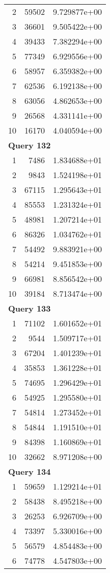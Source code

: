 \begin{longtable}[{p}]{@{}rrp{}@{}}
2 & 59502 & 9.729877e+00 \\
3 & 36601 & 9.505422e+00 \\
4 & 39433 & 7.382294e+00 \\
5 & 77349 & 6.929556e+00 \\
6 & 58957 & 6.359382e+00 \\
7 & 62536 & 6.192138e+00 \\
8 & 63056 & 4.862653e+00 \\
9 & 26568 & 4.331141e+00 \\
10 & 16170 & 4.040594e+00 \\
\midrule
\multicolumn{3}{l}{\bfseries Query 132} \\
1 & 7486 & 1.834688e+01 \\
2 & 9843 & 1.524198e+01 \\
3 & 67115 & 1.295643e+01 \\
4 & 85553 & 1.231324e+01 \\
5 & 48981 & 1.207214e+01 \\
6 & 86326 & 1.034762e+01 \\
7 & 54492 & 9.883921e+00 \\
8 & 54214 & 9.451853e+00 \\
9 & 66981 & 8.856542e+00 \\
10 & 39184 & 8.713474e+00 \\
\midrule
\multicolumn{3}{l}{\bfseries Query 133} \\
1 & 71102 & 1.601652e+01 \\
2 & 9544 & 1.509717e+01 \\
3 & 67204 & 1.401239e+01 \\
4 & 35853 & 1.361228e+01 \\
5 & 74695 & 1.296429e+01 \\
6 & 54925 & 1.295580e+01 \\
7 & 54814 & 1.273452e+01 \\
8 & 54844 & 1.191510e+01 \\
9 & 84398 & 1.160869e+01 \\
10 & 32662 & 8.971208e+00 \\
\midrule
\multicolumn{3}{l}{\bfseries Query 134} \\
1 & 59659 & 1.129214e+01 \\
2 & 58438 & 8.495218e+00 \\
3 & 26253 & 6.926709e+00 \\
4 & 73397 & 5.330016e+00 \\
5 & 56579 & 4.854483e+00 \\
6 & 74778 & 4.547803e+00 \\

\end{longtable}
